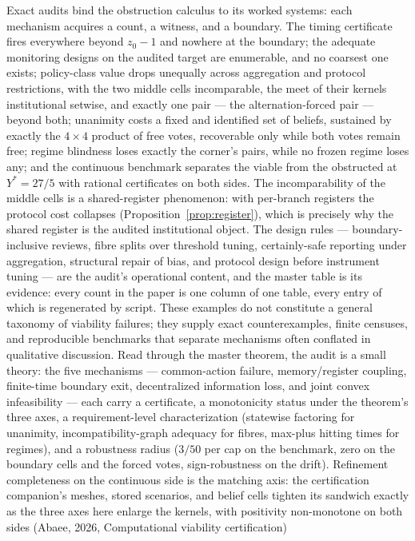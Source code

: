 \documentclass[10pt,twocolumn]{article}
\theoremstyle{definition}
\begin{document}
Exact audits bind the obstruction calculus to its worked systems: each
mechanism acquires a count, a witness, and a boundary. The timing
certificate fires everywhere beyond \(z_0 - 1\) and nowhere at the
boundary; the adequate monitoring designs on the audited target are
enumerable, and no coarsest one exists; policy-class value drops
unequally across aggregation and protocol restrictions, with the two
middle cells incomparable, the meet of their kernels institutional
setwise, and exactly one pair --- the alternation-forced pair --- beyond
both; unanimity costs a fixed and identified set of beliefs, sustained
by exactly the \(4 \times 4\) product of free votes, recoverable only
while both votes remain free; regime blindness loses exactly the
corner's pairs, while no frozen regime loses any; and the continuous
benchmark separates the viable from
the obstructed at \(Y^{*} = 27/5\) with rational certificates on both
sides. The incomparability of the middle cells is a shared-register
phenomenon: with per-branch registers the protocol cost collapses
(Proposition~\ref{prop:register}), which is precisely why the shared
register is the audited institutional object. The design rules --- boundary-inclusive reviews, fibre splits
over threshold tuning, certainly-safe reporting under aggregation,
structural repair of bias, and protocol design before instrument tuning
--- are the audit's operational content, and the master table is its
evidence: every count in the paper is one column of one table, every entry of which is regenerated by script. These examples do not constitute a general taxonomy of viability failures; they supply exact counterexamples, finite censuses, and reproducible benchmarks that separate mechanisms often conflated in qualitative discussion. Read through the master theorem, the audit is a small theory: the five mechanisms --- common-action failure, memory/register coupling, finite-time boundary exit, decentralized information loss, and joint convex infeasibility --- each carry a certificate, a monotonicity status under the theorem's three axes, a requirement-level characterization (statewise factoring for unanimity, incompatibility-graph adequacy for fibres, max-plus hitting times for regimes), and a robustness radius (\(3/50\) per cap on the benchmark, zero on the boundary cells and the forced votes, sign-robustness on the drift). Refinement completeness on the continuous side is the matching axis: the certification companion's meshes, stored scenarios, and belief cells tighten its sandwich exactly as the three axes here enlarge the kernels, with positivity non-monotone on both sides (Abaee, 2026, Computational viability certification)
\end{document}
